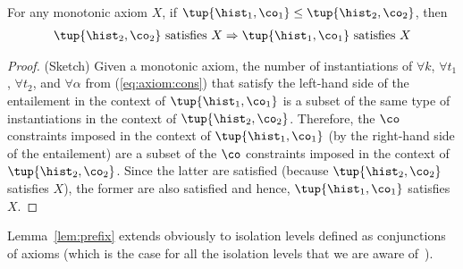 \begin{lemma}\label{lem:prefix}
For any monotonic axiom $X$, if $\tup{\hist_1,\co_1}\leq \tup{\hist_2,\co_2}$, then
\begin{align*}
\tup{\hist_2,\co_2}\mbox{ satisfies } X \Rightarrow \tup{\hist_1,\co_1}\mbox{ satisfies } X
\end{align*}
\end{lemma}
\begin{proof}(Sketch)
Given a monotonic axiom, the number of instantiations of $\forall k$, $\forall t_1$, $\forall t_2$, and $\forall \alpha$ from (\ref{eq:axiom:cons}) that satisfy the left-hand side of the entailement in the context of $\tup{\hist_1,\co_1}$ is a subset of the same type of instantiations in the context of $\tup{\hist_2,\co_2}$. Therefore, the $\co$ constraints imposed in the context of $\tup{\hist_1,\co_1}$ (by the right-hand side of the entailement) are a subset of the $\co$ constraints imposed in the context of $\tup{\hist_2,\co_2}$. Since the latter are satisfied (because $\tup{\hist_2,\co_2}$  satisfies  $X$), the former are also satisfied and hence, $\tup{\hist_1,\co_1}$  satisfies  $X$.
\end{proof}

Lemma~\ref{lem:prefix} extends obviously to isolation levels defined as conjunctions of axioms (which is the case for all the isolation levels that we are aware of~\cite{DBLP:journals/pacmpl/BiswasE19}).

